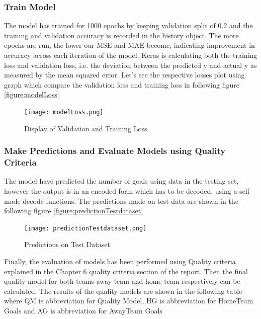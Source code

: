 \subsubsection{Train Model}
The model has trained for 1000 epochs by keeping validation split of 0.2 and the training and validation accuracy is recorded in the history object.
The more epochs are run, the lower our MSE and MAE become, indicating improvement in accuracy across each iteration of the model.\newline
Keras is calculating both the training loss and validation loss, i.e. the deviation between the predicted y and actual y as measured by the mean squared error. Let’s see the respective losses plot using graph which compare the validation loss and training loss in following figure \autoref{figure:modelLoss} \newline
\begin{figure}[H]
\begin{center}
\texttt{[image: modelLoss.png]}
\end{center}
\caption{Display of Validation and Training Loss }
\label{figure:modelLoss}
\end{figure}
\subsubsection{Make Predictions and Evaluate Models using Quality Criteria }
The model have predicted the number of goals using data in the testing set, however the output is in an encoded form which has to be decoded, using a self made decode functions. The predictions made on test data are shown in the following figure \autoref{figure:predictionTestdataset} \newline
\begin{figure}[H]
\begin{center}
\texttt{[image: predictionTestdataset.png]}
\end{center}
\caption{Predictions on Test Dataset }
\label{figure:predictionTestdataset}
\end{figure}
Finally, the evaluation of models has been performed using Quality criteria explained in the Chapter 6 quality criteria section of the report. Then the final quality model for both teams away team and home team respectively can be calculated. The results of the quality models are shown in the following table where QM is abbreviation for Quality Model, HG is abbreviation for HomeTeam Goals and AG is abbreviation for AwayTeam Goals\newline

